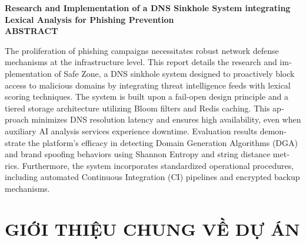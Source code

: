 \documentclass[13pt,a4paper]{extreport}
\begin{document}
\clearpage

\begin{center}\fontsize{16pt}{18pt}
    \textbf{Research and Implementation of a DNS Sinkhole System integrating Lexical Analysis for Phishing Prevention\\}
    \textbf{ABSTRACT}
\end{center}

\begin{english}
The proliferation of phishing campaigns necessitates robust network defense mechanisms at the infrastructure level. This report details the research and implementation of Safe Zone, a DNS sinkhole system designed to proactively block access to malicious domains by integrating threat intelligence feeds with lexical scoring techniques. The system is built upon a fail-open design principle and a tiered storage architecture utilizing Bloom filters and Redis caching. This approach minimizes DNS resolution latency and ensures high availability, even when auxiliary AI analysis services experience downtime. Evaluation results demonstrate the platform's efficacy in detecting Domain Generation Algorithms (DGA) and brand spoofing behaviors using Shannon Entropy and string distance metrics. Furthermore, the system incorporates standardized operational procedures, including automated Continuous Integration (CI) pipelines and encrypted backup mechanisms.
\end{english}


\clearpage


\pagestyle{plain}

\tableofcontents
\clearpage

\listoffigures
\clearpage



\clearpage

\setcounter{page}{1}

\chapter{GIỚI THIỆU CHUNG VỀ DỰ ÁN}



\end{document}
